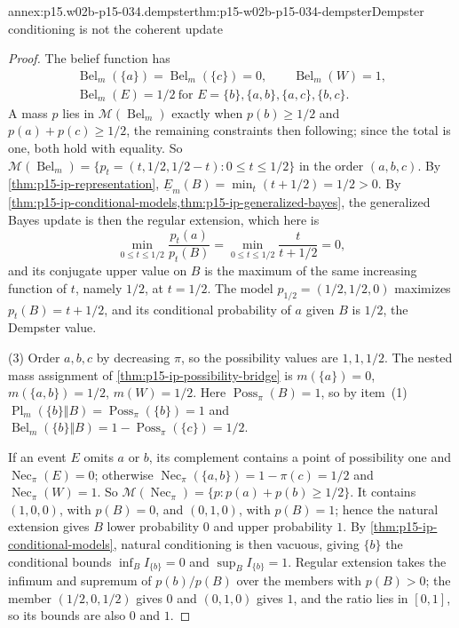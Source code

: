 \begin{annexitem}{annex:p15.w02b-p15-034.dempster}{thm:p15-w02b-p15-034-dempster}{Dempster conditioning is not the coherent update}
\begin{proof}
The belief function has
\[
\begin{gathered}
 \operatorname{Bel}_m(\{a\})=\operatorname{Bel}_m(\{c\})=0,\qquad
 \operatorname{Bel}_m(W)=1,\\
 \operatorname{Bel}_m(E)=1/2\ \text{for } E=\{b\},\{a,b\},\{a,c\},\{b,c\}.
\end{gathered}
\] A mass \(p\) lies in
\(\mathcal M(\operatorname{Bel}_m)\) exactly when \(p(b)\geq1/2\) and
\(p(a)+p(c)\geq1/2\), the remaining constraints then following; since
the total is one, both hold with equality. So
\(\mathcal M(\operatorname{Bel}_m)=\{p_t=(t,1/2,1/2-t):0\leq t\leq1/2\}\)
in the order \((a,b,c)\). By \cref{thm:p15-ip-representation},
\(\underline E_m(B)=\min_t(t+1/2)=1/2>0\). By
\cref{thm:p15-ip-conditional-models,thm:p15-ip-generalized-bayes}, the
generalized Bayes update is then the regular extension, which here is
\[
 \min_{0\leq t\leq1/2}\frac{p_t(a)}{p_t(B)}=\min_{0\leq t\leq1/2}\frac{t}{t+1/2}=0,
\]
and its conjugate upper value on \(B\) is the maximum of the same
increasing function of \(t\), namely \(1/2\), at \(t=1/2\). The model
\(p_{1/2}=(1/2,1/2,0)\) maximizes \(p_t(B)=t+1/2\), and its conditional
probability of \(a\) given \(B\) is \(1/2\), the Dempster value.

(3) Order \(a,b,c\) by decreasing \(\pi\), so the possibility values are
\(1,1,1/2\). The nested mass assignment of
\cref{thm:p15-ip-possibility-bridge} is \(m(\{a\})=0\),
\(m(\{a,b\})=1/2\), \(m(W)=1/2\). Here
\(\operatorname{Poss}_\pi(B)=1\), so by item~(1)
\(\operatorname{Pl}_m(\{b\}\Vert B)=\operatorname{Poss}_\pi(\{b\})=1\) and
\(\operatorname{Bel}_m(\{b\}\Vert B)=1-\operatorname{Poss}_\pi(\{c\})=1/2\).

If an event \(E\) omits \(a\) or \(b\), its complement contains a point
of possibility one and \(\operatorname{Nec}_\pi(E)=0\); otherwise
\(\operatorname{Nec}_\pi(\{a,b\})=1-\pi(c)=1/2\) and
\(\operatorname{Nec}_\pi(W)=1\). So
\(\mathcal M(\operatorname{Nec}_\pi)=\{p:p(a)+p(b)\geq1/2\}\). It contains
\((1,0,0)\), with \(p(B)=0\), and \((0,1,0)\), with \(p(B)=1\); hence the
natural extension gives \(B\) lower probability \(0\) and upper probability
\(1\). By \cref{thm:p15-ip-conditional-models}, natural conditioning is then
vacuous, giving \(\{b\}\) the conditional bounds \(\inf_BI_{\{b\}}=0\) and
\(\sup_BI_{\{b\}}=1\). Regular extension takes the infimum and supremum of
\(p(b)/p(B)\) over the members with \(p(B)>0\); the member
\((1/2,0,1/2)\) gives \(0\) and \((0,1,0)\) gives \(1\), and the ratio lies
in \([0,1]\), so its bounds are also \(0\) and \(1\).


\end{proof}
\end{annexitem}
